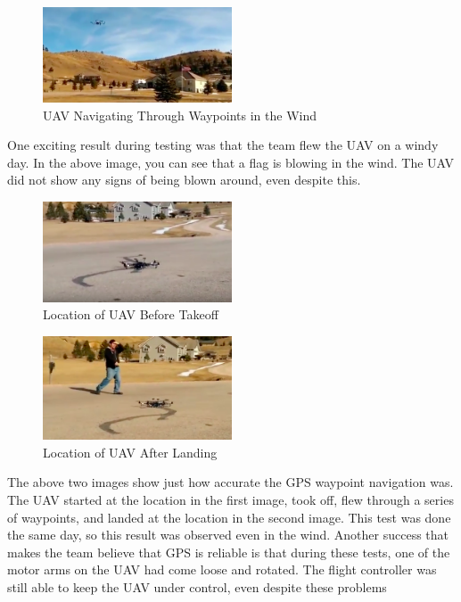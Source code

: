 \documentclass{article}
\begin{document}
		\begin{figure}[h]
			\centering
			\includegraphics[width=0.5\textwidth]{wind.png}
			\caption{UAV Navigating Through Waypoints in the Wind}
		\end{figure}
		
	One exciting result during testing was that the team flew the UAV on a windy day. In the above image, you can see that a flag is blowing in the wind. The UAV did not show any signs of being blown around, even despite this.

		\begin{figure}[h]
			\centering
			\includegraphics[width=0.5\textwidth]{start.png}
			\caption{Location of UAV Before Takeoff}
		\end{figure}	

		\begin{figure}[h]
			\centering
			\includegraphics[width=0.5\textwidth]{end.png}
			\caption{Location of UAV After Landing}
		\end{figure}	

	The above two images show just how accurate the GPS waypoint navigation was. The UAV started at the location in the first image, took off, flew through a series of waypoints, and landed at the location in the second image. This test was done the same day, so this result was observed even in the wind. Another success that makes the team believe that GPS is reliable is that during these tests, one of the motor arms on the UAV had come loose and rotated. The flight controller was still able to keep the UAV under control, even despite these problems
	
	
\end{document}
